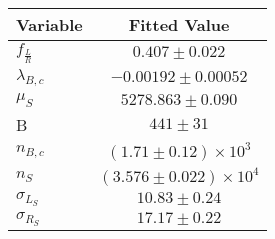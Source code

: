 \begin{tabular}[t]{lc}
\hline
Variable &Fitted Value\\
\hline\hline
$f_{\frac{L}{R}}$&$0.407\pm0.022$\\
\hline
$\lambda_{B,c}$&$-0.00192\pm0.00052$\\
\hline
$\mu_S$&$5278.863\pm0.090$\\
\hline
B&$441\pm31$\\
\hline
$n_{B,c}$&$(1.71\pm0.12)\times 10^3$\\
\hline
$n_S$&$(3.576\pm0.022)\times 10^4$\\
\hline
$\sigma_{L_S}$&$10.83\pm0.24$\\
\hline
$\sigma_{R_S}$&$17.17\pm0.22$\\
\hline
\end{tabular}